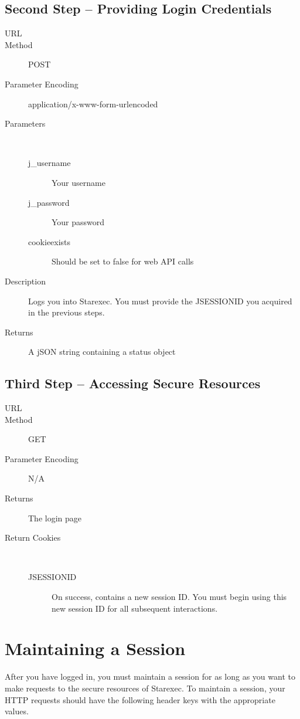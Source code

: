 \subsection*{Second Step -- Providing Login Credentials}

\begin{description}
\item [URL] 
\item [Method] POST
\item [Parameter Encoding] application/x-www-form-urlencoded
\item [Parameters] \
    \begin{description}
    \item [j\_username]  Your username
    \item [j\_password] \type{String} Your password
    \item [cookieexists]  Should be set to false for web API calls
    \end{description}

\item [Description] Logs you into Starexec. You must provide the JSESSIONID you acquired in the previous steps.
\item [Returns] A jSON string containing a status object
\end{description}

\subsection*{Third Step -- Accessing Secure Resources}

\begin{description}
\item [URL] 
\item [Method] GET
\item [Parameter Encoding] N/A
\item [Returns] The login page
\item [Return Cookies] \
	\begin{description}
	\item [JSESSIONID]  On success, contains a new session ID. You must begin using this new session ID for all subsequent interactions.
	\end{description}
\end{description}

\section{Maintaining a Session}
After you have logged in, you must maintain a session for as long as you want to make requests to the secure resources of Starexec. To maintain a session, your HTTP requests should have the following header keys with the appropriate values.

